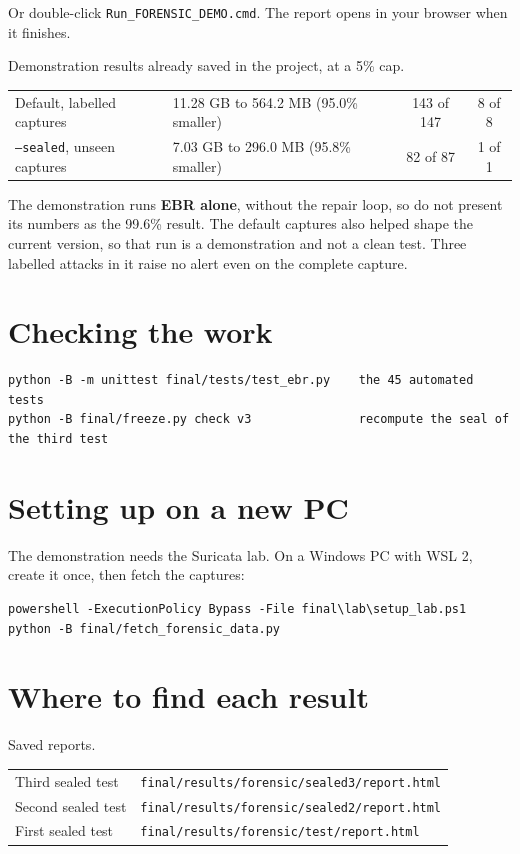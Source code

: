 Or double-click \texttt{Run\_FORENSIC\_DEMO.cmd}. The report opens in your browser when it finishes.

\begin{gtable}{Demonstration results already saved in the project, at a 5\% cap.}
\begin{tabularx}{\linewidth}{L l c c}
\toprule
{} &  &  & \\
\midrule
Default, labelled captures & 11.28 GB to 564.2 MB (95.0\% smaller) & 143 of 147 & 8 of 8\\
\texttt{--sealed}, unseen captures & 7.03 GB to 296.0 MB (95.8\% smaller) & 82 of 87 & 1 of 1\\
\bottomrule
\end{tabularx}
\end{gtable}

\begin{careful}
The demonstration runs \textbf{EBR alone}, without the repair loop, so do not present its numbers as the 99.6\% result. The default captures also helped shape the current version, so that run is a demonstration and not a clean test. Three labelled attacks in it raise no alert even on the complete capture.
\end{careful}

\section{Checking the work}
\begin{lstlisting}
python -B -m unittest final/tests/test_ebr.py    the 45 automated tests
python -B final/freeze.py check v3               recompute the seal of the third test
\end{lstlisting}

\section{Setting up on a new PC}
The demonstration needs the Suricata lab. On a Windows PC with WSL 2, create it once, then fetch the captures:
\begin{lstlisting}
powershell -ExecutionPolicy Bypass -File final\lab\setup_lab.ps1
python -B final/fetch_forensic_data.py
\end{lstlisting}

\section{Where to find each result}
\begin{gtable}{Saved reports.}
\begin{tabularx}{\linewidth}{l L}
\toprule
{} & \\
\midrule
Third sealed test & \texttt{final/results/forensic/sealed3/report.html}\\
Second sealed test & \texttt{final/results/forensic/sealed2/report.html}\\
First sealed test & \texttt{final/results/forensic/test/report.html}\\
\bottomrule
\end{tabularx}
\end{gtable}

